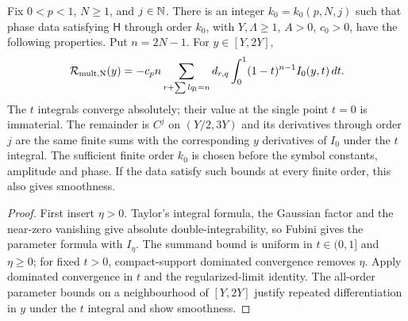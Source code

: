 \begin{lemma}
  \label{lem:c03_mult_remainder_parameter_integral}
  Fix $0<p<1$, $N\ge1$, and $j\in\mathbb{N}$. There is an integer $k_0=k_0(p,N,j)$ such that
  phase data satisfying $\mathsf H$ through order $k_0$, with $Y,\Lambda\ge1$, $A>0$, $c_0>0$,
  have the following properties. Put $n=2N-1$.
  For $y\in[Y,2Y]$,
  \[
    \mathcal{R}_{\rm mult,N}(y)=-c_p n\sum_{r+\sum lq_l=n}d_{r,q}
         \int_0^1(1-t)^{n-1}I_0(y,t)\,dt.
  \]
  The $t$ integrals converge absolutely; their value at the single point $t=0$ is immaterial.
  The remainder is $C^j$ on $(Y/2,3Y)$ and its derivatives through order $j$ are the same finite sums
  with the corresponding $y$ derivatives of $I_0$ under the $t$ integral.
  The sufficient finite order $k_0$ is chosen before the symbol constants, amplitude and phase.
  If the data satisfy such bounds at every finite order, this also gives smoothness.
\end{lemma}
\begin{proof}
  First insert $\eta>0$. Taylor's integral formula, the Gaussian factor and the near-zero vanishing
  give absolute double-integrability, so Fubini gives the parameter formula with $I_\eta$.
  The summand bound is uniform in $t\in(0,1]$ and $\eta\ge0$; for fixed $t>0$, compact-support
  dominated convergence removes $\eta$. Apply dominated convergence in $t$ and the regularized-limit
  identity. The all-order parameter bounds on a neighbourhood of $[Y,2Y]$ justify repeated
  differentiation in $y$ under the $t$ integral and show smoothness.
\end{proof}

